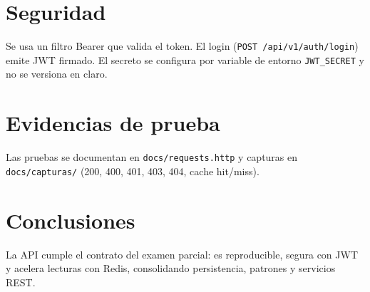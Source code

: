 \documentclass[12pt,a4paper]{article}
\begin{document}
\section{Seguridad}
Se usa un filtro Bearer que valida el token. El login (\texttt{POST /api/v1/auth/login}) emite JWT firmado. El secreto se configura por variable de entorno \texttt{JWT\_SECRET} y no se versiona en claro.

\section{Evidencias de prueba}
Las pruebas se documentan en \texttt{docs/requests.http} y capturas en \texttt{docs/capturas/} (200, 400, 401, 403, 404, cache hit/miss).

\section{Conclusiones}
La API cumple el contrato del examen parcial: es reproducible, segura con JWT y acelera lecturas con Redis, consolidando persistencia, patrones y servicios REST.



\end{document}
